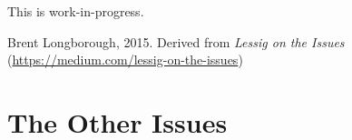 \documentclass[%
 11pt,
 a4paper,
 extrafontsizes,
    twoside, %
 ]{memoir}
\begin{document}
\frontmatter
%
This is work-in-progress.

\ccby{} Brent Longborough, 2015. Derived from \textit{Lessig on the Issues}
(\url{https://medium.com/lessig-on-the-issues})

\tableofcontents*
\mainmatter
\pagestyle{headings}

\chapter{The Other Issues}















\end{document}
